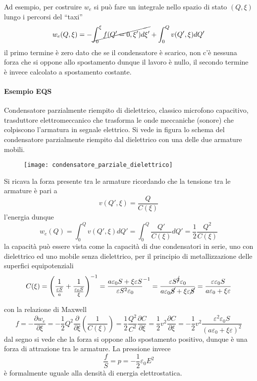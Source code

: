 Ad esempio, per costruire $w_e$ si può fare un integrale nello spazio di stato $(Q,\xi)$ lungo i percorsi del ``taxi''
$$
w_e(Q,\xi) = -\cancel{\int_0^\xi f(Q'=0,\xi')d\xi'} + \int_0^Qv(Q',\xi)dQ'
$$
il primo termine è zero dato che se il condensatore è scarico, non c'è nessuna forza che si oppone allo spostamento
dunque il lavoro è nullo, il secondo termine è invece calcolato a spostamento costante.
\newpage
\paragraph{Esempio EQS} Condensatore parzialmente riempito di dielettrico, classico microfono capacitivo, trasduttore 
elettromeccanico che trasforma le onde meccaniche (sonore) che colpiscono l'armatura in segnale elettrico.
Si vede in figura lo schema del condensatore parzialmente riempito dal dielettrico con una delle due armature mobili.
\begin{figure}[H]
\centering
\texttt{[image: condensatore\_parziale\_dielettrico]}
\end{figure}
Si ricava la forza presente tra le armature ricordando che la tensione tra le armature è pari a
$$
v(Q',\xi)=\frac{Q}{C(\xi)}
$$
l'energia dunque
$$
w_e(Q) = \int_0^Qv(Q',\xi)dQ' = \int_0^Q\frac{Q'}{C(\xi)}dQ' = \frac{1}{2}\frac{Q^2}{C(\xi)}
$$
la capacità può essere vista come la capacità di due condensatori in serie, uno con dielettrico ed uno mobile
senza dielettrico, per il principio di metallizzazione delle superfici equipotenziali
$$
C(\xi) = \left(\frac{1}{\frac{\varepsilon S}{a}} +  \frac{1}{\frac{\varepsilon_0 S}{\xi}}\right)^{-1} =
\frac{a\varepsilon_0S + \xi\varepsilon S}{\varepsilon S^2 \varepsilon_0}^{-1} = 
\frac{\varepsilon S^{\cancel{2}} \varepsilon_0}{a\varepsilon_0\cancel{S} + \xi\varepsilon \cancel{S}} =
\frac{\varepsilon\varepsilon_0S}{a\varepsilon_0 + \xi\varepsilon}
$$

con la relazione di Maxwell
$$
f = -\frac{\partial w_e}{\partial \xi} = -\frac{1}{2}Q^2\frac{\partial}{\partial\xi}\left(\frac{1}{C(\xi)}\right)=
\frac{1}{2}\frac{Q^2}{C^2}\frac{\partial C}{\partial\xi} = \frac{1}{2}v^2\frac{\partial C}{\partial\xi} = -\frac{1}{2}v^2\frac{\varepsilon^2\varepsilon_0S}{\left(a\varepsilon_0+\xi\varepsilon\right)^2}
$$
dal segno si vede che la forza si oppone allo spostamento positivo, dunque è una forza di attrazione tra le
armature.
La pressione invece
$$
\frac{f}{S} = p = -\frac{1}{2}\varepsilon_0 E^2
$$
è formalmente uguale alla densità di energia elettrostatica.
\newpage
